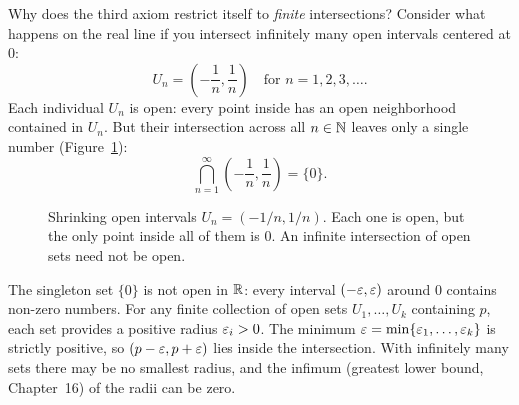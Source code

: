 Why does the third axiom restrict itself to \emph{finite} intersections? Consider what happens on the real line if you intersect infinitely many open intervals centered at $0$:
\[
U_n = \left(-\frac{1}{n}, \frac{1}{n}\right) \quad \text{for } n = 1, 2, 3, \dots.
\]
Each individual $U_n$ is open: every point inside has an open neighborhood contained in $U_n$. But their intersection across all $n \in \mathbb{N}$ leaves only a single number (Figure~\ref{37:fig-shrinking-intervals}):
\[
\bigcap_{n=1}^\infty \left(-\frac{1}{n}, \frac{1}{n}\right) = \{0\}.
\]

\begin{figure}[htbp]
\centering
{}
\caption{Shrinking open intervals $U_n = (-1/n, 1/n)$. Each one is open, but the only point inside all of them is $0$. An infinite intersection of open sets need not be open.}\label{37:fig-shrinking-intervals}
\end{figure}

The singleton set $\{0\}$ is not open in $\mathbb{R}$: every interval $(-\varepsilon, \varepsilon)$ around $0$ contains non-zero numbers. For any finite collection of open sets $U_1, \dots, U_k$ containing $p$, each set provides a positive radius $\varepsilon_i > 0$. The minimum $\varepsilon = \min\{\varepsilon_1, \dots, \varepsilon_k\}$ is strictly positive, so $(p - \varepsilon, p + \varepsilon)$ lies inside the intersection. With infinitely many sets there may be no smallest radius, and the infimum (greatest lower bound, Chapter~16) of the radii can be zero.

